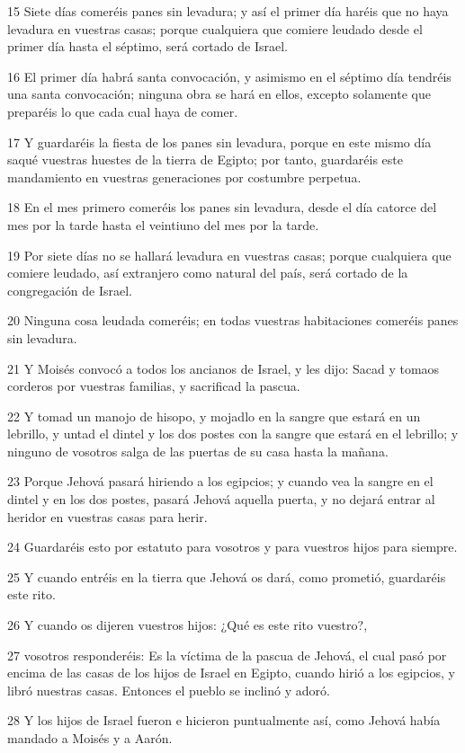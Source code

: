 \par 15 Siete días comeréis panes sin levadura; y así el primer día haréis que no haya levadura en vuestras casas; porque cualquiera que comiere leudado desde el primer día hasta el séptimo, será cortado de Israel.
\par 16 El primer día habrá santa convocación, y asimismo en el séptimo día tendréis una santa convocación; ninguna obra se hará en ellos, excepto solamente que preparéis lo que cada cual haya de comer.
\par 17 Y guardaréis la fiesta de los panes sin levadura, porque en este mismo día saqué vuestras huestes de la tierra de Egipto; por tanto, guardaréis este mandamiento en vuestras generaciones por costumbre perpetua.
\par 18 En el mes primero comeréis los panes sin levadura, desde el día catorce del mes por la tarde hasta el veintiuno del mes por la tarde.
\par 19 Por siete días no se hallará levadura en vuestras casas; porque cualquiera que comiere leudado, así extranjero como natural del país, será cortado de la congregación de Israel.
\par 20 Ninguna cosa leudada comeréis; en todas vuestras habitaciones comeréis panes sin levadura.
\par 21 Y Moisés convocó a todos los ancianos de Israel, y les dijo: Sacad y tomaos corderos por vuestras familias, y sacrificad la pascua.
\par 22 Y tomad un manojo de hisopo, y mojadlo en la sangre que estará en un lebrillo, y untad el dintel y los dos postes con la sangre que estará en el lebrillo; y ninguno de vosotros salga de las puertas de su casa hasta la mañana.
\par 23 Porque Jehová pasará hiriendo a los egipcios; y cuando vea la sangre en el dintel y en los dos postes, pasará Jehová aquella puerta, y no dejará entrar al heridor en vuestras casas para herir.
\par 24 Guardaréis esto por estatuto para vosotros y para vuestros hijos para siempre.
\par 25 Y cuando entréis en la tierra que Jehová os dará, como prometió, guardaréis este rito.
\par 26 Y cuando os dijeren vuestros hijos: ¿Qué es este rito vuestro?,
\par 27 vosotros responderéis: Es la víctima de la pascua de Jehová, el cual pasó por encima de las casas de los hijos de Israel en Egipto, cuando hirió a los egipcios, y libró nuestras casas. Entonces el pueblo se inclinó y adoró.
\par 28 Y los hijos de Israel fueron e hicieron puntualmente así, como Jehová había mandado a Moisés y a Aarón.

